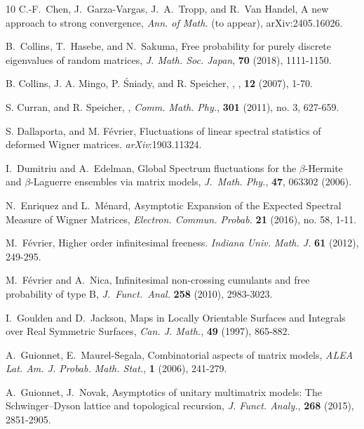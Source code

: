 \documentclass[11pt]{amsart}
\theoremstyle{definition}
\numberwithin{theorem}{section}
\begin{document}
\begin{thebibliography}{10}
 C.-F.~Chen, J.~Garza-Vargas, J.~A.~Tropp, 
  and R.~Van Handel, A new approach to strong convergence,
  \textit{Ann. of Math.} (to appear), arXiv:2405.16026.

 B.~Collins, T.~Hasebe, and N.~Sakuma, Free
  probability for purely discrete eigenvalues of random
  matrices, \textit{J. Math. Soc. Japan}, \textbf{70}
  (2018), 1111-1150.

 B. Collins, J. A. Mingo, P. \'Sniady, and
  R. Speicher, , , \textbf{12} (2007), 1-70.

 S. Curran, and R. Speicher,
  ,
  \textit{Comm. Math. Phy.}, \textbf{301} (2011), no. 3,
  627-659.

 S. Dallaporta, and M. Février, Fluctuations of
  linear spectral statistics of deformed Wigner
  matrices. \textit{arXiv}:1903.11324.

 I.~Dumitriu and A.~Edelman, Global Spectrum
  fluctuations for the $\beta$-Hermite and $\beta$-Laguerre
  ensembles via matrix models, \textit{J.~Math. Phy.},
  \textbf{47}, 063302 (2006).

 N.~Enriquez and L.~Ménard, Asymptotic
  Expansion of the Expected Spectral Measure of Wigner
  Matrices, \textit{Electron. Commun. Probab.} \textbf{21}
  (2016), no. 58, 1-11.

 M.~Février, Higher order infinitesimal
  freeness. \textit{Indiana Univ. Math. J.} \textbf{61}
  (2012), 249-295.
  
 M.~Février and A.~Nica, Infinitesimal
  non-crossing cumulants and free probability of type B,
  \textit{J.~Funct.~Anal.} \textbf{258} (2010), 2983-3023.

 I.~Goulden and D.~Jackson, Maps in Locally
  Orientable Surfaces and Integrals over Real Symmetric
  Surfaces, \textit{Can. J. Math.}, \textbf{49} (1997),
  865-882.
  
 A.~Guionnet, E.~Maurel-Segala, Combinatorial
  aspects of matrix models, \textit{ALEA
    Lat. Am. J. Probab. Math. Stat.}, \textbf{1} (2006),
  241-279.
  
 A.~Guionnet, J.~Novak, Asymptotics of unitary
  multimatrix models: The Sch\-winger–Dyson lattice and
  topological recursion, \textit{J. Funct. Analy.},
  \textbf{268} (2015), 2851-2905.


\end{thebibliography}
\end{document}
